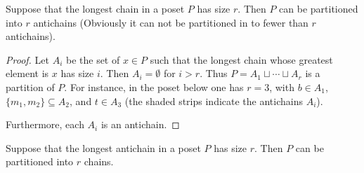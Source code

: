 \documentclass[11pt, a4paper]{ctexrep}
\begin{document}
\begin{theorem}[Mirsky]
    Suppose that the longest chain in a poset $P$ has size $r$. Then $P$ can be partitioned into $r$ antichains (Obviously it can not be partitioned in to fewer than $r$ antichains).
\end{theorem}

\begin{proof}
    Let $A_i$ be the set of $x\in P$ such that the longest chain whose greatest element is $x$ has size $i$.
    Then $A_i=\emptyset$ for $i>r$.
    Thus $P=A_1\sqcup\cdots\sqcup A_r$ is a partition of $P$.
    For instance, in the poset below one has $r=3$, with $b\in A_1$, $\{m_1,m_2\}\subseteq A_2$, and $t\in A_3$ (the shaded strips indicate the antichains $A_i$).
    \begin{center}
    \end{center}
    Furthermore, each $A_i$ is an antichain.
\end{proof}

\begin{theorem}\label{thm:dilworth}
    Suppose that the longest antichain in a poset $P$ has size $r$. Then $P$ can be partitioned into $r$ chains.
\end{theorem}
\end{document}

